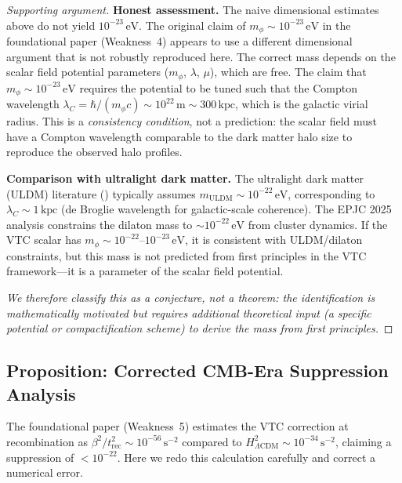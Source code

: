 \documentclass[11pt,a4paper]{article}
\theoremstyle{definition}
\newcommand{\rec}{\mathrm{rec}}
\begin{document}
\begin{proof}[Supporting argument]
\textbf{Honest assessment.} The naive dimensional estimates above do not yield $10^{-23}\,\mathrm{eV}$. The original claim of $m_\phi \sim 10^{-23}\,\mathrm{eV}$ in the foundational paper (Weakness~4) appears to use a different dimensional argument that is not robustly reproduced here. The correct mass depends on the scalar field potential parameters ($m_\phi$, $\lambda$, $\mu$), which are free. The claim that $m_\phi \sim 10^{-23}\,\mathrm{eV}$ requires the potential to be tuned such that the Compton wavelength $\lambda_C = \hbar/(m_\phi c) \sim 10^{22}\,\mathrm{m} \sim 300\,\mathrm{kpc}$, which is the galactic virial radius. This is a \textit{consistency condition}, not a prediction: the scalar field must have a Compton wavelength comparable to the dark matter halo size to reproduce the observed halo profiles.

\textbf{Comparison with ultralight dark matter.} The ultralight dark matter (ULDM) literature (\cite{Hui2021}) typically assumes $m_{\mathrm{ULDM}} \sim 10^{-22}\,\mathrm{eV}$, corresponding to $\lambda_C \sim 1\,\mathrm{kpc}$ (de Broglie wavelength for galactic-scale coherence). The EPJC 2025 analysis constrains the dilaton mass to $\sim 10^{-22}\,\mathrm{eV}$ from cluster dynamics. If the VTC scalar has $m_\phi \sim 10^{-22}$--$10^{-23}\,\mathrm{eV}$, it is consistent with ULDM/dilaton constraints, but this mass is not predicted from first principles in the VTC framework---it is a parameter of the scalar field potential.

\textit{We therefore classify this as a conjecture, not a theorem: the identification is mathematically motivated but requires additional theoretical input (a specific potential or compactification scheme) to derive the mass from first principles.}
\end{proof}

\subsection{Proposition: Corrected CMB-Era Suppression Analysis}
\label{prop:cmb_corrected}

The foundational paper (Weakness~5) estimates the VTC correction at recombination as $\beta^2/t_{\rec}^2 \sim 10^{-56}\,\mathrm{s}^{-2}$ compared to $H_{\Lambda\mathrm{CDM}}^2 \sim 10^{-34}\,\mathrm{s}^{-2}$, claiming a suppression of $< 10^{-22}$. Here we redo this calculation carefully and correct a numerical error.
\end{document}

